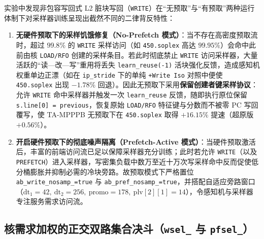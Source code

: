 \documentclass[10.5pt,compsoc,UTF8]{CjC}
\begin{document}
实验中发现非包容写回式 L2 脏块写回（\texttt{WRITE}）在“无预取”与“有预取”两种运行体制下对采样器训练呈现出截然不同的二律背反特性：
\begin{enumerate}
  \item \textbf{无硬件预取下的采样饥饿修复（No-Prefetch 模式）}：当不存在高密度预取流时，超过 $99.8\%$ 的 \texttt{WRITE} 采样访问（如 \texttt{450.soplex} 高达 $99.95\%$）会命中此前由核 \texttt{LOAD/RFO} 创建的采样条目。若此时彻底禁止 \texttt{WRITE} 访问采样器，大量活跃的“读—改—写”重用将丢失 \texttt{learn\_reuse(-1)} 活块强化反馈，造成感知机权重单边正漂（如在 \texttt{ip\_stride} 下的单纯 \texttt{+Write Iso} 对照中便使 \texttt{450.soplex} 出现 $-1.78\%$ 回退）。因此无预取下采用\textbf{保留创建者键采样协议}：允许 \texttt{WRITE} 命中采样器并触发一次 \texttt{learn\_reuse} 反馈，随即执行原位保留 \texttt{s.line[0] = previous}，恢复原始 \texttt{LOAD/RFO} 特征键与分数而不被零 PC 写回覆写，使 TA-MPPPB 无预取下在 \texttt{450.soplex} 取得 $+16.15\%$ 提速（超原版 $+0.56\%$）。
  \item \textbf{开启硬件预取下的彻底噪声隔离（Prefetch-Active 模式）}：当硬件预取激活后，丰富的前端访问流已足以保障采样器充分训练；此时若允许 \texttt{WRITE}（以及 \texttt{PREFETCH}）进入采样器，写密集负载中数万至近十万次写采样命中反而促使低分桶膨胀并抑制必需的冷块旁路。故预取模式下严格置位 \texttt{ab\_write\_nosamp\_=true} 与 \texttt{ab\_pref\_nosamp\_=true}，并搭配自适应旁路窗口（$\mathrm{dt}_1=42,\ \mathrm{dt}_2=256,\ \mathrm{promo}=178,\ \mathrm{plv}[2][1]=14$），令感知机与采样器专注服务需求访问流。
\end{enumerate}

\subsection{\texorpdfstring{核需求加权的正交双路集合决斗（\texttt{wsel\_} 与 \texttt{pfsel\_}）}{核需求加权的正交双路集合决斗（wsel\_ 与 pfsel\_）}}
\end{document}
